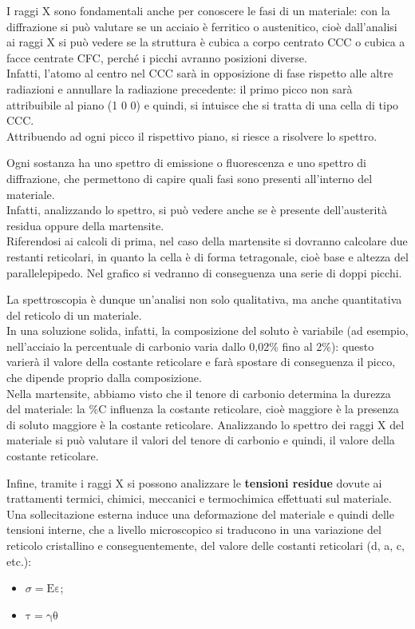 I raggi X sono fondamentali anche per conoscere le fasi di un materiale: con la diffrazione si può valutare se un acciaio è ferritico o austenitico, cioè dall’analisi ai raggi X si può vedere se la struttura è cubica a corpo centrato CCC o cubica a facce centrate CFC, perché i picchi avranno posizioni diverse.\\
Infatti, l’atomo al centro nel CCC sarà in opposizione di fase rispetto alle altre radiazioni e annullare la radiazione precedente: il primo picco non sarà attribuibile al piano (1 0 0) e quindi, si intuisce che si tratta di una cella di tipo CCC.\\
Attribuendo ad ogni picco il rispettivo piano, si riesce a risolvere lo spettro.

Ogni sostanza ha uno spettro di emissione o fluorescenza e uno spettro di diffrazione, che permettono di capire quali fasi sono presenti all’interno del materiale.\\
Infatti, analizzando lo spettro, si può vedere anche se è presente dell’austerità residua oppure della martensite.\\
Riferendosi ai calcoli di prima, nel caso della martensite si dovranno calcolare due restanti reticolari, in quanto la cella è di forma tetragonale, cioè base e altezza del parallelepipedo. Nel grafico si vedranno di conseguenza una serie di doppi picchi.

La spettroscopia è dunque un’analisi non solo qualitativa, ma anche quantitativa del reticolo di un materiale.\\
In una soluzione solida, infatti, la composizione del soluto è variabile (ad esempio, nell’acciaio la percentuale di carbonio varia dallo 0,02\% fino al 2\%): questo varierà il valore della costante reticolare e farà spostare di conseguenza il picco, che dipende proprio dalla composizione. \\
Nella martensite, abbiamo visto che il tenore di carbonio determina la durezza del materiale: la \%C influenza la costante reticolare, cioè maggiore è la presenza di soluto maggiore è la costante reticolare. Analizzando lo spettro dei raggi X del materiale si può valutare il valori del tenore di carbonio e quindi, il valore della costante reticolare.

Infine, tramite i raggi X si possono analizzare le \textbf{tensioni residue} dovute ai trattamenti termici, chimici, meccanici e termochimica effettuati sul materiale.
Una sollecitazione esterna induce una deformazione del materiale e quindi delle tensioni interne, che a livello microscopico si traducono in una variazione del reticolo cristallino e conseguentemente, del valore delle costanti reticolari (d, a, c, etc.):
\begin{itemize}
\item $\sigma = \mathrm{E\varepsilon}$;
\item $\mathrm{\tau = \gamma\theta}$
\end{itemize}

